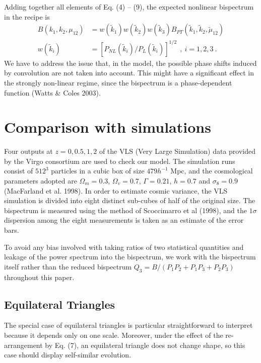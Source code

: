 \documentclass[]{mn2e}
\begin{document}
Adding together all elements of Eq. (4) -- (9), the expected
nonlinear bispectrum in the recipe is
\begin{equation}
\begin{aligned}
B(k_1, k_2, \mu_{12}) & =w(\widetilde{k}_1)w(\widetilde{k}_2)w(\widetilde{k}_3)B_{PT}(\widetilde{k}_1,\widetilde{k}_2, \widetilde{\mu}_{12}) \\
w(\widetilde{k}_i)&=\left[P_{NL}(\widetilde{k}_i)/P_{L}(\widetilde{k}_i)\right]^{1/2}
\ \ ,\  i=1, 2, 3 \ .
\end{aligned}
\label{eq:model}
\end{equation}
We have to address the issue that, in the model, the possible phase
shifts induced by convolution are not taken into account. This might
have a significant effect in the strongly non-linear regime, since
the bispectrum is a phase-dependent function (Watts \& Coles 2003).


\section{Comparison with simulations}
Four outputs at $z=0, 0.5, 1, 2$ of the VLS (Very Large Simulation)
data provided by the Virgo consortium are used to check our model.
The simulation runs consist of $512^3$ particles in a cubic box of
size $479h^{-1}$ Mpc, and the cosmological parameters adopted are
$\Omega_m=0.3$, $\Omega_v=0.7$, $\Gamma=0.21$, $h=0.7$ and
$\sigma_8=0.9$ (MacFarland et al. 1998). In order to estimate cosmic
variance, the VLS simulation is divided into eight distinct
sub-cubes of half of the original size. The bispectrum is measured
using the method of Scoccimarro et al (1998), and the $1\sigma$
dispersion among the eight measurements is taken as an estimate of
the error bars.

To avoid any bias involved with taking ratios of two statistical
quantities and leakage of the power spectrum into the bispectrum, we
work with the bispectrum itself rather than the reduced bispectrum
$Q_3=B/(P_1 P_2 + P_1 P_3 +P_2 P_3)$ throughout this paper.

\subsection{Equilateral Triangles}
The special case of equilateral triangles is particular
straightforward to interpret because it depends only on one scale.
Moreover, under the effect of the re-arrangement by Eq. (7), an
equilateral triangle does not change shape, so this case should
display self-similar evolution.
\end{document}
